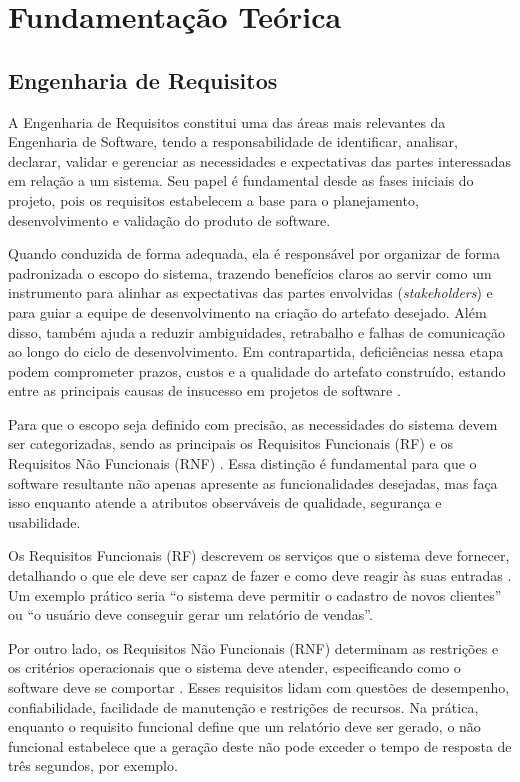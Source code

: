 \chapter{Fundamentação Teórica}
\label{cap:fundamentacao}

\section{Engenharia de Requisitos}
\label{sec:engenharia_requisitos}

A Engenharia de Requisitos constitui uma das áreas mais relevantes da Engenharia de Software, tendo a responsabilidade de identificar, analisar, declarar, validar e gerenciar as necessidades e expectativas das partes interessadas em relação a um sistema. Seu papel é fundamental desde as fases iniciais do projeto, pois os requisitos estabelecem a base para o planejamento, desenvolvimento e validação do produto de software.

Quando conduzida de forma adequada, ela é responsável por organizar de forma padronizada o escopo do sistema, trazendo benefícios claros ao servir como um instrumento para alinhar as expectativas das partes envolvidas (\textit{stakeholders}) e para guiar a equipe de desenvolvimento na criação do artefato desejado. Além disso, também ajuda a reduzir ambiguidades, retrabalho e falhas de comunicação ao longo do ciclo de desenvolvimento. Em contrapartida, deficiências nessa etapa podem comprometer prazos, custos e a qualidade do artefato construído, estando entre as principais causas de insucesso em projetos de software \cite{sommerville2016}.

Para que o escopo seja definido com precisão, as necessidades do sistema devem ser categorizadas, sendo as principais os Requisitos Funcionais (RF) e os Requisitos Não Funcionais (RNF) \cite{laplante2022}. Essa distinção é fundamental para que o software resultante não apenas apresente as funcionalidades desejadas, mas faça isso enquanto atende a atributos observáveis de qualidade, segurança e usabilidade.

Os Requisitos Funcionais (RF) descrevem os serviços que o sistema deve fornecer, detalhando o que ele deve ser capaz de fazer e como deve reagir às suas entradas \cite{laplante2022}. Um exemplo prático seria ``o sistema deve permitir o cadastro de novos clientes'' ou ``o usuário deve conseguir gerar um relatório de vendas''.

Por outro lado, os Requisitos Não Funcionais (RNF) determinam as restrições e os critérios operacionais que o sistema deve atender, especificando como o software deve se comportar \cite{laplante2022}. Esses requisitos lidam com questões de desempenho, confiabilidade, facilidade de manutenção e restrições de recursos. Na prática, enquanto o requisito funcional define que um relatório deve ser gerado, o não funcional estabelece que a geração deste não pode exceder o tempo de resposta de três segundos, por exemplo.

